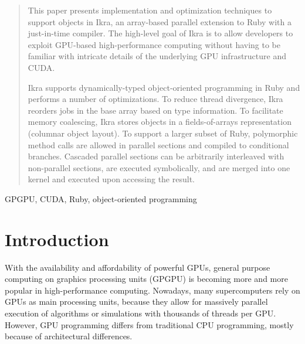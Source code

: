 \documentclass[preprint]{sigplanconf}
\begin{document}
\begin{abstract}
This paper presents implementation and optimization techniques to support objects in Ikra, an array-based parallel extension to Ruby with a just-in-time compiler. The high-level goal of Ikra is to allow developers to exploit GPU-based high-performance computing without having to be familiar with intricate details of the underlying GPU infrastructure and CUDA.

Ikra supports dynamically-typed object-oriented programming in Ruby and performs a number of optimizations. To reduce thread divergence, Ikra reorders jobs in the base array based on type information. To facilitate memory coalescing, Ikra stores objects in a fields-of-arrays representation (columnar object layout). To support a larger subset of Ruby, polymorphic method calls are allowed in parallel sections and compiled to conditional branches. Cascaded parallel sections can be arbitrarily interleaved with non-parallel sections, are executed symbolically, and are merged into one kernel and executed upon accessing the result.

\end{abstract}



\keywords
GPGPU, CUDA, Ruby, object-oriented programming

\section{Introduction}
With the availability and affordability of powerful GPUs, general purpose computing on graphics processing units (GPGPU) is becoming more and more popular in high-performance computing. Nowadays, many supercomputers rely on GPUs as main processing units, because they allow for massively parallel execution of algorithms or simulations with thousands of threads per GPU. However, GPU programming differs from traditional CPU programming, mostly because of architectural differences.
\end{document}
